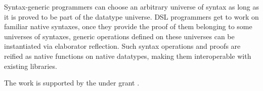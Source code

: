 \documentclass[sigplan,review,fleqn]{acmart}
\begin{document}
Syntax-generic programmers can choose an arbitrary universe of syntax as long as it is proved to be part of the datatype universe.
DSL programmers get to work on familiar native syntaxes, once they provide the proof of them belonging to some universes of syntaxes, generic operations defined on these universes can be instantiated via elaborator reflection.
Such syntax operations and proofs are reified as native functions on native datatypes, making them interoperable with existing libraries.
\begin{acks}
The work is supported by the  under grant .
\end{acks}




%
\end{document}
